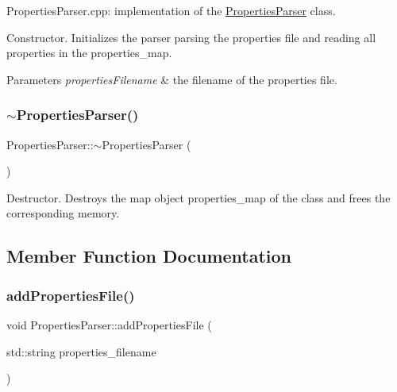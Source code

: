 Properties\+Parser.\+cpp\+: implementation of the \mbox{\hyperlink{class_properties_parser}{Properties\+Parser}} class.

Constructor. Initializes the parser parsing the properties file and reading all properties in the {\ttfamily properties\+\_\+map}.


\begin{DoxyParams}{Parameters}
{\em properties\+Filename} & the filename of the properties file. \\
\hline
\end{DoxyParams}
\mbox{\label{class_properties_parser_a78329eb9c674e1cf5b085d466709a4b6}} 
\subsubsection{\texorpdfstring{$\sim$\+Properties\+Parser()}{~PropertiesParser()}}
{\footnotesize\ttfamily Properties\+Parser\+::$\sim$\+Properties\+Parser (\begin{DoxyParamCaption}{ }\end{DoxyParamCaption})}

Destructor. Destroys the map object properties\+\_\+map of the class and frees the corresponding memory. 

\subsection{Member Function Documentation}
\mbox{\label{class_properties_parser_a03f177b8082dad1abd2faf60db7a7a6a}} 
\subsubsection{\texorpdfstring{add\+Properties\+File()}{addPropertiesFile()}}
{\footnotesize\ttfamily void Properties\+Parser\+::add\+Properties\+File (\begin{DoxyParamCaption}\item[{std\+::string}]{properties\+\_\+filename }\end{DoxyParamCaption})}

